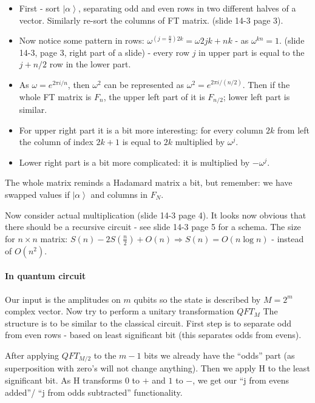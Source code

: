 \documentclass{scrartcl}
\newcommand{\ket}[1]{\left| #1 \right>} %
\newcommand{\means}{\Rightarrow} %
\begin{document}
\begin{itemize}
\item First - sort $\ket \alpha$, separating odd and even rows in two different
  halves of a vector. Similarly re-sort the columns of FT matrix. (slide 14-3
  page 3).
\item Now notice some pattern in rows: $\omega^{(j = \frac n2)2k} = \omega{2jk +
    nk}$ - as $\omega^{kn} = 1$. (slide 14-3, page 3, right part of a slide) -
  every row $j$ in upper part is equal to the $j + n/2$ row in the lower part.
\item As $\omega = e^{2 \pi i/n}$, then $\omega^2$ can be represented as
  $\omega^2 = e^{2 \pi i /(n/2)}$. Then if the whole FT matrix is $F_n$, the
  upper left part of it is $F_{n/2}$; lower left part is similar.
\item For upper right part it is a bit more interesting: for every column $2k$
  from left the column of index $2k+1$ is equal to $2k$ multiplied by
  $\omega^j$.
\item Lower right part is a bit more complicated: it is multiplied by
  $-\omega^j$.
\end{itemize}
The whole matrix reminds a Hadamard matrix a bit, but remember: we have swapped
values if $\ket \alpha$ and columns in $F_N$.

Now consider actual multiplication (slide 14-3 page 4). It looks now obvious
that there should be a recursive circuit - see slide 14-3 page 5 for a schema.
The size for $n\times n$ matrix: $S(n) - 2S(\frac n2) + O(n) \means S(n) = O(n
\log n)$ - instead of $O(n^2)$.

\paragraph{In quantum circuit}

Our input is the amplitudes on $m$ qubits so the state is described by $M = 2^m$
complex vector. Now try to perform a unitary transformation $QFT_M$
The structure is to be similar to the classical circuit. First step is to
separate odd from even rows - based on least significant bit (this separates
odds from evens).

After applying $QFT_{M/2}$ to the $m-1$ bits we already have the ``odds'' part
(as superposition with zero's will not change anything). Then we apply H to the
least significant bit. As H transforms $0$ to $+$ and $1$ to $-$, we get our ``j
from evens added''/ ``j from odds subtracted'' functionality.
\end{document}

